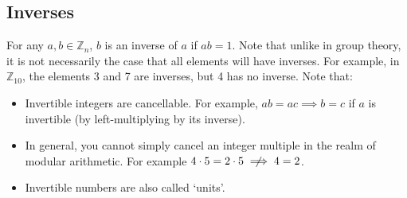 \subsection{Inverses}
For any \(a, b \in \mathbb Z_n\), \(b\) is an inverse of \(a\) if \(ab=1\). Note that unlike in group theory, it is not necessarily the case that all elements will have inverses. For example, in \(\mathbb Z_{10}\), the elements 3 and 7 are inverses, but 4 has no inverse. Note that:
\begin{itemize}
	\item Invertible integers are cancellable. For example, \(ab=ac \implies b=c\) if \(a\) is invertible (by left-multiplying by its inverse).
	\item In general, you cannot simply cancel an integer multiple in the realm of modular arithmetic. For example \(4 \cdot 5 = 2 \cdot 5 \centernot\implies 4 = 2\).
	\item Invertible numbers are also called `units'.
\end{itemize}
